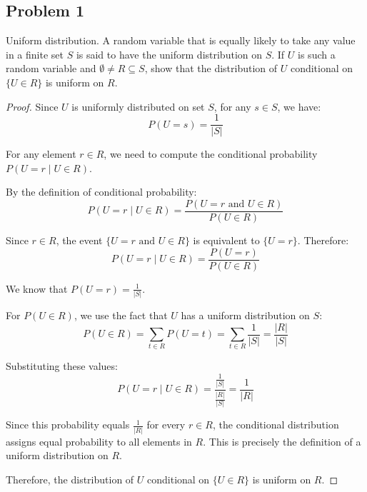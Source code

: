 \documentclass[letterpaper, 11pt]{article}
\newcommand{\1}{\mathds{1}}	%
\theoremstyle{definition}
\begin{document}
\subsection*{Problem 1}
Uniform distribution. A random variable that is equally likely to take any value in a finite set $S$ is said to have the uniform distribution on $S$. If $U$ is such a random variable and $\emptyset \neq R \subseteq S$, show that the distribution of $U$ conditional on $\{U \in R\}$ is uniform on $R$.
\begin{proof}
    Since $U$ is uniformly distributed on set $S$, for any $s \in S$, we have:
\[ P(U = s) = \frac{1}{|S|} \]

For any element $r \in R$, we need to compute the conditional probability $P(U = r \mid U \in R)$.

By the definition of conditional probability:
\[ P(U = r \mid U \in R) = \frac{P(U = r \text{ and } U \in R)}{P(U \in R)} \]

Since $r \in R$, the event $\{U = r \text{ and } U \in R\}$ is equivalent to $\{U = r\}$. Therefore:
\[ P(U = r \mid U \in R) = \frac{P(U = r)}{P(U \in R)} \]

We know that $P(U = r) = \frac{1}{|S|}$.

For $P(U \in R)$, we use the fact that $U$ has a uniform distribution on $S$:
\[ P(U \in R) = \sum_{t \in R} P(U = t) = \sum_{t \in R} \frac{1}{|S|} = \frac{|R|}{|S|} \]

Substituting these values:
\[ P(U = r \mid U \in R) = \frac{\frac{1}{|S|}}{\frac{|R|}{|S|}} = \frac{1}{|R|} \]

Since this probability equals $\frac{1}{|R|}$ for every $r \in R$, the conditional distribution assigns equal probability to all elements in $R$. This is precisely the definition of a uniform distribution on $R$.

Therefore, the distribution of $U$ conditional on $\{U \in R\}$ is uniform on $R$.
\end{proof}
\end{document}
